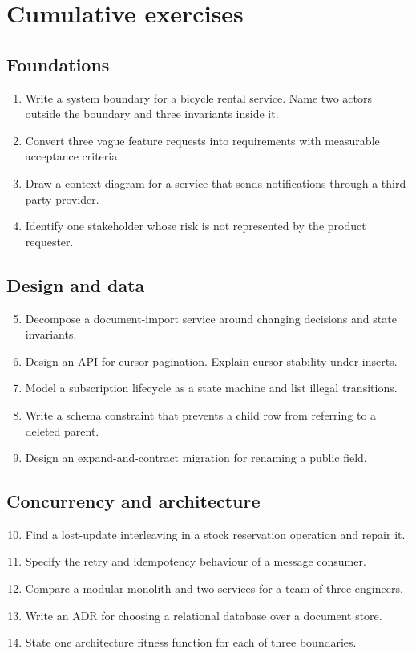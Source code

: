 \chapter{Cumulative exercises}

\section{Foundations}
\begin{enumerate}
  \item Write a system boundary for a bicycle rental service. Name two actors outside the boundary and three invariants inside it.
  \item Convert three vague feature requests into requirements with measurable acceptance criteria.
  \item Draw a context diagram for a service that sends notifications through a third-party provider.
  \item Identify one stakeholder whose risk is not represented by the product requester.
\end{enumerate}

\section{Design and data}
\begin{enumerate}
  \setcounter{enumi}{4}
  \item Decompose a document-import service around changing decisions and state invariants.
  \item Design an API for cursor pagination. Explain cursor stability under inserts.
  \item Model a subscription lifecycle as a state machine and list illegal transitions.
  \item Write a schema constraint that prevents a child row from referring to a deleted parent.
  \item Design an expand-and-contract migration for renaming a public field.
\end{enumerate}

\section{Concurrency and architecture}
\begin{enumerate}
  \setcounter{enumi}{9}
  \item Find a lost-update interleaving in a stock reservation operation and repair it.
  \item Specify the retry and idempotency behaviour of a message consumer.
  \item Compare a modular monolith and two services for a team of three engineers.
  \item Write an ADR for choosing a relational database over a document store.
  \item State one architecture fitness function for each of three boundaries.
\end{enumerate}

